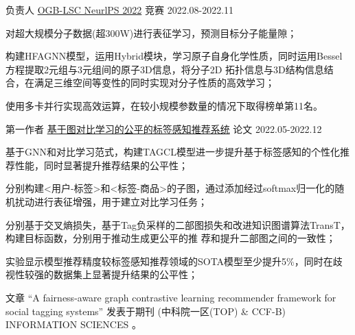 \begin{cventries}
\cventry
{负责人} %
{\href{https://ogb.stanford.edu/neurips2022/results/}{OGB-LSC NeurlPS 2022}} %
{竞赛} %
{2022.08-2022.11} %
{
  \begin{cvitems} %
    \item {对超大规模分子数据(超300W)进行表征学习，预测目标分子能量隙；}
    \item {构建HFAGNN模型，运用Hybrid模块，学习原子自身化学性质，同时运用Bessel方程提取2元组与3元组间的原子3D信息，将分子2D
    拓扑信息与3D结构信息结合，在满足三维空间等变性的同时实现对分子性质的高效学习；}
    \item {使用多卡并行实现高效运算，在较小规模参数量的情况下取得榜单第11名。}
  \end{cvitems}
}

\cventry
{第一作者} %
{\href{https://www.sciencedirect.com/science/article/pii/S0020025523006497}{基于图对比学习的公平的标签感知推荐系统}} %
{论文} %
{2022.05-2022.12} %
{
  \begin{cvitems} %
    \item {基于GNN和对比学习范式，构建TAGCL模型进一步提升基于标签感知的个性化推荐性能，同时显著提升推荐结果的公平性；}
    \item {分别构建<用户-标签>和<标签-商品>的子图，通过添加经过softmax归一化的随机扰动进行表征增强，用于建立对比学习任务；}
    \item {分别基于交叉熵损失，基于Tag负采样的二部图损失和改进知识图谱算法TransT，构建目标函数，分别用于推动生成更公平的推
    荐和提升二部图之间的一致性；}
    \item {实验显示模型推荐精度较标签感知推荐领域的SOTA模型至少提升5\%，同时在歧视性较强的数据集上显著提升结果的公平性；}
    \item {文章 “A fairness-aware graph contrastive learning recommender framework for social tagging systems” 发表于期刊 (中科院一区(TOP) \& CCF-B) INFORMATION SCIENCES 。}   
  \end{cvitems}
}



\end{cventries}
